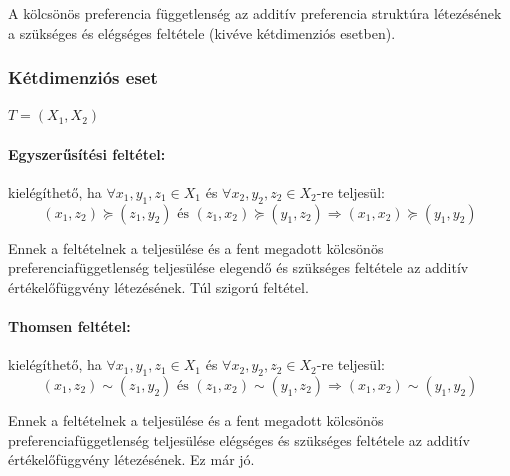 \documentclass[a4paper,12pt]{article}
\begin{document}
A kölcsönös preferencia függetlenség az additív preferencia struktúra létezésének a szükséges és elégséges feltétele (kivéve kétdimenziós esetben).

\subsubsection{Kétdimenziós eset}

$T=(X_1,X_2)$

\paragraph{Egyszerűsítési feltétel: } kielégíthető, ha $\forall x_1, y_1, z_1 \in X_1$ és $\forall x_2, y_2, z_2 \in X_2$-re teljesül: 
\begin{equation}
(x_1, z_2) \succeq (z_1, y_2) \text{ és } (z_1, x_2) \succeq (y_1, z_2)  
\Rightarrow
(x_1, x_2) \succeq (y_1, y_2)
\end{equation} 

Ennek a feltételnek a teljesülése és a fent megadott kölcsönös preferenciafüggetlenség teljesülése elegendő és szükséges feltétele az additív értékelőfüggvény létezésének. Túl szigorú feltétel.

\paragraph{Thomsen feltétel:} kielégíthető, ha $\forall x_1, y_1, z_1 \in X_1$ és $\forall x_2, y_2, z_2 \in X_2$-re teljesül: 
\begin{equation}
(x_1, z_2) \sim (z_1, y_2) \text{ és } (z_1, x_2) \sim (y_1, z_2)  
\Rightarrow
(x_1, x_2) \sim (y_1, y_2)
\end{equation} 

Ennek a feltételnek a teljesülése és a fent megadott kölcsönös preferenciafüggetlenség teljesülése elégséges és szükséges feltétele az additív értékelőfüggvény létezésének. Ez már jó.

\end{document}

